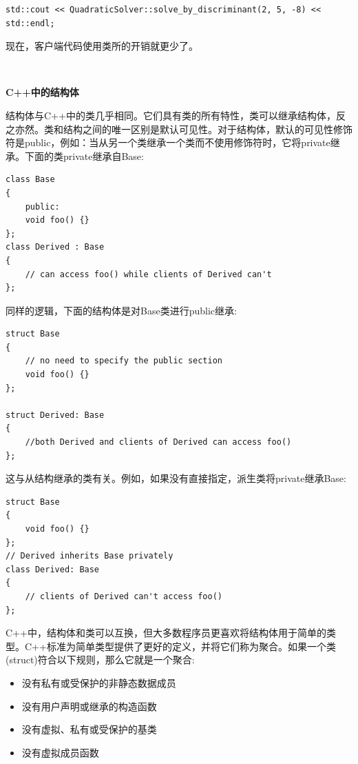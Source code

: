 \begin{lstlisting}[caption={}]
std::cout << QuadraticSolver::solve_by_discriminant(2, 5, -8) << std::endl;
\end{lstlisting}

现在，客户端代码使用类所的开销就更少了。 \par

\noindent\textbf{}\ \par
\textbf{C++中的结构体} \ \par
结构体与C++中的类几乎相同。它们具有类的所有特性，类可以继承结构体，反之亦然。类和结构之间的唯一区别是默认可见性。对于结构体，默认的可见性修饰符是public，例如：当从另一个类继承一个类而不使用修饰符时，它将private继承。下面的类private继承自Base: \par

\begin{lstlisting}[caption={}]
class Base
{
	public:
	void foo() {}
};
class Derived : Base
{
	// can access foo() while clients of Derived can't
};
\end{lstlisting}

同样的逻辑，下面的结构体是对Base类进行public继承: \par

\begin{lstlisting}[caption={}]
struct Base
{
	// no need to specify the public section
	void foo() {}
};

struct Derived: Base
{
	//both Derived and clients of Derived can access foo()
};
\end{lstlisting}

这与从结构继承的类有关。例如，如果没有直接指定，派生类将private继承Base:\par

\begin{lstlisting}[caption={}]
struct Base
{
	void foo() {}
};
// Derived inherits Base privately
class Derived: Base
{
	// clients of Derived can't access foo()
};
\end{lstlisting}

C++中，结构体和类可以互换，但大多数程序员更喜欢将结构体用于简单的类型。C++标准为简单类型提供了更好的定义，并将它们称为聚合。如果一个类(struct)符合以下规则，那么它就是一个聚合: \par

\begin{itemize}
	\item 没有私有或受保护的非静态数据成员
	\item 没有用户声明或继承的构造函数
	\item 没有虚拟、私有或受保护的基类
	\item 没有虚拟成员函数
\end{itemize}

